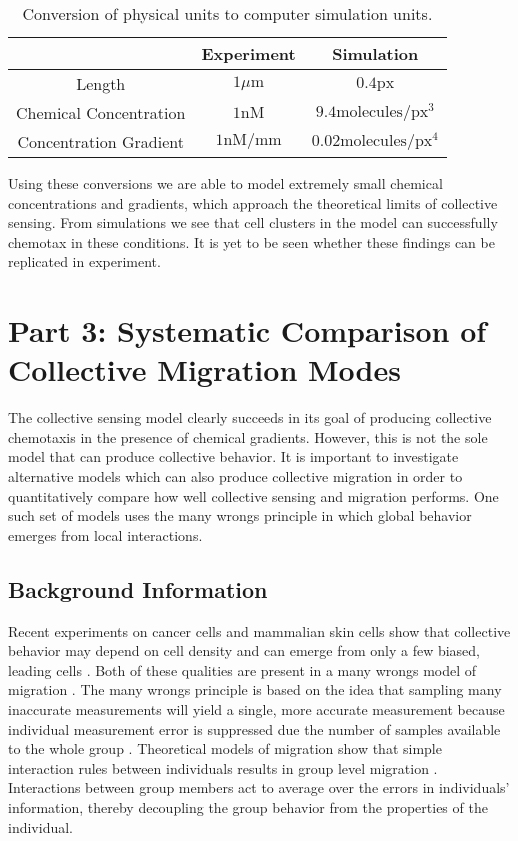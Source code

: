 \documentclass[phys,prelim]{puthesis}
\begin{document}
\begin{table}[t]
\begin{center}
\begin{tabular}{ |c|c|c| }
    \hline
    \ & Experiment & Simulation \\ \hline
    Length & $1 \mu\text{m}$ & $0.4 \text{px}$ \\ \hline
    Chemical Concentration & $1\text{nM}$ & $9.4\text{molecules}/\text{px}^3$  \\ \hline
    Concentration Gradient & $1\text{nM}/\text{mm}$ & $0.02\text{molecules}/\text{px}^4$ \\ \hline
\end{tabular}
\caption{Conversion of physical units to computer simulation units.}
\label{units}
\end{center}
\end{table}

Using these conversions we are able to model extremely small chemical concentrations and gradients, which approach the theoretical limits of collective sensing. From simulations we see that cell clusters in the model can successfully chemotax in these conditions. It is yet to be seen whether these findings can be replicated in experiment.

\section{Part 3: Systematic Comparison of Collective Migration Modes}

The collective sensing model clearly succeeds in its goal of producing collective chemotaxis in the presence of chemical gradients. However, this is not the sole model that can produce collective behavior. It is important to investigate alternative models which can also produce collective migration in order to quantitatively compare how well collective sensing and migration performs. One such set of models uses the many wrongs principle in which global behavior emerges from local interactions.

\subsection{Background Information}

Recent experiments on cancer cells and mammalian skin cells show that collective behavior may depend on cell density and can emerge from only a few biased, leading cells \cite{deisboeck2009collective}. Both of these qualities are present in a many wrongs model of migration \cite{vicsek1995novel,coburn2013tactile}. The many wrongs principle is based on the idea that sampling many inaccurate measurements will yield a single, more accurate measurement because individual measurement error is suppressed due the number of samples available to the whole group \cite{simons2004many}. Theoretical models of migration show that simple interaction rules between individuals results in group level migration \cite{vicsek1995novel}. Interactions between group members act to average over the errors in individuals' information, thereby decoupling the group behavior from the properties of the individual.
\end{document}
